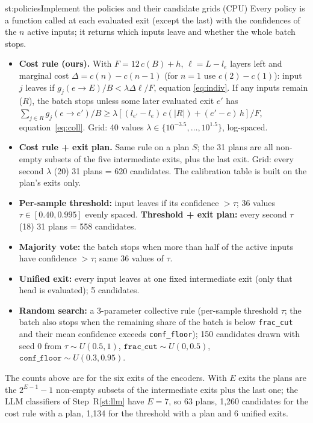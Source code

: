 \begin{step}{st:policies}{Implement the policies and their candidate grids (CPU)}
Every policy is a function called at each evaluated exit (except the last) with the confidences of the $n$ active
inputs; it returns which inputs leave and whether the whole batch stops.
\begin{itemize}
  \item \textbf{Cost rule (ours).} With $F=12\,c(B)+h$, $\ell=L-l_e$ layers left and marginal cost
  $\Delta=c(n)-c(n-1)$ (for $n=1$ use $c(2)-c(1)$): input $j$ leaves if $g_j(e\to E)/B<\lambda\Delta\ell/F$, equation
  \eqref{eq:indiv}. If any inputs remain ($R$), the batch stops unless some later evaluated exit $e'$ has
  $\sum_{j\in R} g_j(e\to e')/B \ge \lambda[(l_{e'}-l_e)\,c(|R|)+(e'-e)\,h]/F$, equation~\eqref{eq:coll}.
  Grid: 40 values $\lambda\in\{10^{-3.5},\dots,10^{1.5}\}$, log-spaced.
  \item \textbf{Cost rule + exit plan.} Same rule on a plan $S$; the 31 plans are all non-empty subsets of the five
  intermediate exits, plus the last exit. Grid: every second $\lambda$ (20) \x{} 31 plans = 620 candidates. The
  calibration table is built on the plan's exits only.
  \item \textbf{Per-sample threshold:} input leaves if its confidence $>\tau$; 36 values $\tau\in[0.40,0.995]$ evenly
  spaced. \textbf{Threshold + exit plan:} every second $\tau$ (18) \x{} 31 plans = 558 candidates.
  \item \textbf{Majority vote:} the batch stops when more than half of the active inputs have confidence $>\tau$;
  same 36 values of $\tau$.
  \item \textbf{Unified exit:} every input leaves at one fixed intermediate exit (only that head is evaluated); 5
  candidates.
  \item \textbf{Random search:} a 3-parameter collective rule (per-sample threshold $\tau$; the batch also stops when
  the remaining share of the batch is below \texttt{frac\_cut} and their mean confidence exceeds \texttt{conf\_floor});
  150 candidates drawn with seed 0 from $\tau\sim U(0.5,1)$, $\texttt{frac\_cut}\sim U(0,0.5)$,
  $\texttt{conf\_floor}\sim U(0.3,0.95)$.
\end{itemize}
The counts above are for the six exits of the encoders. With $E$ exits the plans are the $2^{E-1}-1$ non-empty subsets
of the intermediate exits plus the last one; the LLM classifiers of Step~R\ref{st:llm} have $E=7$, so 63 plans, 1{,}260
candidates for the cost rule with a plan, 1{,}134 for the threshold with a plan and 6 unified exits.
\end{step}

